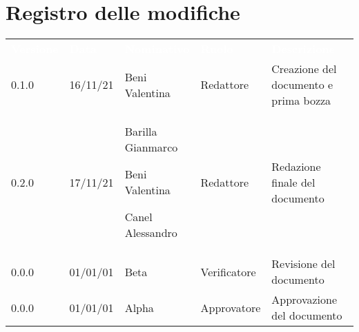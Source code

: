 \section*{Registro delle modifiche}

{\renewcommand{\arraystretch}{1.5}
\begin{tabular}{p{0.15\linewidth}p{0.14\linewidth}p{0.21\linewidth}p{0.15\linewidth}p{0.35\linewidth}}
	\rowcolor[RGB]{33, 73, 50}
	\textcolor{white}{\textbf{Versione}} & \textcolor{white}{\textbf{Data}} & \textcolor{white}
	{\textbf{Nominativo}} & \textcolor{white}{\textbf{Ruolo}} & \textcolor{white}
	{\textbf{Descrizione}}\\
	\rowcolor[RGB]{216, 235, 171}
	0.1.0 & 16/11/21 & Beni Valentina & Redattore & Creazione del documento e prima bozza\\
	\rowcolor[RGB]{233, 245, 206}
	0.2.0 & 17/11/21 & Barilla Gianmarco \par  Beni Valentina  \par Canel Alessandro & Redattore & Redazione finale del documento\\
	\rowcolor[RGB]{216, 235, 171}
	0.0.0 & 01/01/01 & Beta & Verificatore & Revisione del documento\\
	\rowcolor[RGB]{216, 235, 171}
	0.0.0 & 01/01/01 & Alpha & Approvatore & Approvazione del documento\\
	
\end{tabular}	
}
